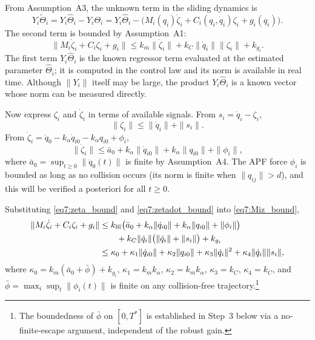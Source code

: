 From Assumption~A3, the unknown term in the sliding dynamics is
\begin{equation}
	Y_i\tilde{\Theta}_i = Y_i\hat{\Theta}_i - Y_i\Theta_i
	= Y_i\hat{\Theta}_i - \bigl(M_i(q_i)\dot{\zeta}_i + C_i(q_i,\dot{q}_i)\zeta_i + g_i(q_i)\bigr).
	\label{eq7:Ytb_split}
\end{equation}
The second term is bounded by Assumption~A1:
\begin{equation}
	\|M_i\dot{\zeta}_i + C_i\zeta_i + g_i\|
	\le k_{\overline m}\|\dot{\zeta}_i\| + k_C\|\dot{q}_i\|\|\zeta_i\| + k_{g_i}.
	\label{eq7:Miz_bound}
\end{equation}
The first term $Y_i\hat{\Theta}_i$ is the known regressor term evaluated at the estimated
parameter $\hat{\Theta}_i$; it is computed in the control law and its norm is available
in real time.  Although $\|Y_i\|$ itself may be large, the product $Y_i\hat{\Theta}_i$ is
a known vector whose norm can be measured directly.

Now express $\zeta_i$ and $\dot{\zeta}_i$ in terms of available signals.  From $s_i = \dot{q}_i - \zeta_i$,
\begin{equation}
	\|\zeta_i\| \le \|\dot{q}_i\| + \|s_i\|.
	\label{eq7:zeta_bound}
\end{equation}
From $\dot{\zeta}_i = \ddot{q}_0 - k_\alpha\dot{q}_{i0} - k_\alpha q_{i0} + \phi_i$,
\begin{equation}
	\|\dot{\zeta}_i\| \le \bar{a}_0 + k_\alpha\|\dot{q}_{i0}\| + k_\alpha\|q_{i0}\| + \|\phi_i\|,
	\label{eq7:zetadot_bound}
\end{equation}
where $\bar{a}_0 = \sup_{t\ge0}\|\ddot{q}_0(t)\|$ is finite by Assumption~A4.
The APF force $\phi_i$ is bounded as long as no collision occurs (its norm is finite
when $\|q_{ij}\| > d$), and this will be verified a posteriori for all $t\ge0$.

Substituting \eqref{eq7:zeta_bound} and \eqref{eq7:zetadot_bound} into \eqref{eq7:Miz_bound},
\begin{align}
	\|M_i\dot{\zeta}_i + C_i\zeta_i + g_i\|
	&\le k_{\overline m}\bigl(\bar{a}_0 + k_\alpha\|\dot{q}_{i0}\| + k_\alpha\|q_{i0}\| + \|\phi_i\|\bigr) \notag\\
	&\qquad + k_C\|\dot{q}_i\|\bigl(\|\dot{q}_i\| + \|s_i\|\bigr) + k_{g_i} \notag\\
	&\le \kappa_0 + \kappa_1\|\dot{q}_{i0}\| + \kappa_2\|q_{i0}\|
		+ \kappa_3\|\dot{q}_i\|^2 + \kappa_4\|\dot{q}_i\|\|s_i\|,
		\label{eq7:Miz_bound_expanded}
\end{align}
where $\kappa_0 = k_{\overline m}(\bar{a}_0 + \bar{\phi}) + k_{g_i}$,
$\kappa_1 = k_{\overline m}k_\alpha$, $\kappa_2 = k_{\overline m}k_\alpha$,
$\kappa_3 = k_C$, $\kappa_4 = k_C$, and $\bar{\phi} = \max_i\sup_t\|\phi_i(t)\|$ is
finite on any collision-free trajectory.\footnote{The boundedness of $\bar{\phi}$ on
$[0,T^*]$ is established in Step~3 below via a no-finite-escape argument, independent
of the robust gain.}

